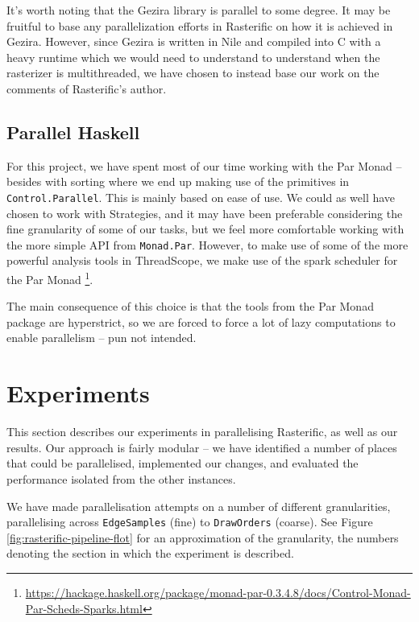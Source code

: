 \documentclass[12pt, a4paper]{article}
\begin{document}
It's worth noting that the Gezira library is parallel to some degree. It may be fruitful to base any parallelization efforts in Rasterific on how it is achieved in Gezira. However,
since Gezira is written in Nile and compiled into C with a heavy runtime which we would need to understand to understand when the rasterizer is multithreaded, we have chosen to instead
 base our work on the comments of Rasterific's author.
\subsection{Parallel Haskell}
For this project, we have spent most of our time working with the Par Monad -- besides with sorting where we end up making use of the primitives in \texttt{Control.Parallel}.
 This is mainly based on ease of use. We could as well have chosen to work with Strategies, and it may
have been preferable considering the fine granularity of some of our tasks, but we feel more comfortable working with the more simple API from \texttt{Monad.Par}.
However, to make use of some of the more powerful analysis tools in ThreadScope, we make use of the spark scheduler for the Par Monad
\footnote{\url{https://hackage.haskell.org/package/monad-par-0.3.4.8/docs/Control-Monad-Par-Scheds-Sparks.html}}.

The main consequence of this choice is that the tools from the Par Monad package are hyperstrict, so we are forced to force a lot of lazy computations to enable parallelism -- pun not intended.




\section{Experiments}\label{experiments}

This section describes our experiments in parallelising Rasterific, as well as our results. Our approach is fairly modular -- we have identified a number of places that could be parallelised, implemented our changes, and evaluated the performance isolated from the other instances.

We have made parallelisation attempts on a number of different granularities, parallelising across \texttt{EdgeSamples} (fine) to \texttt{DrawOrders} (coarse). See Figure \ref{fig:rasterific-pipeline-flot} for an approximation of the granularity, the numbers denoting the section in which the experiment is described.
\end{document}
